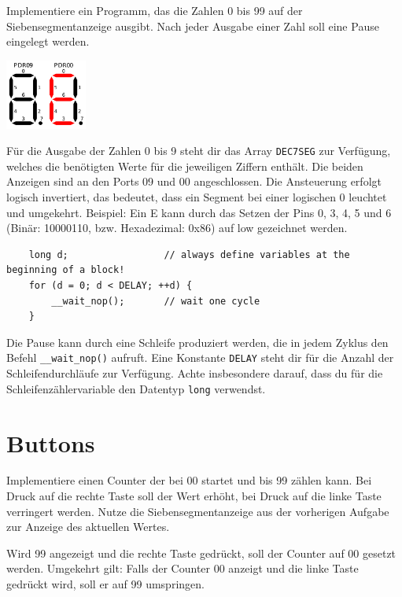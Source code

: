 Implementiere ein Programm, das die Zahlen 0 bis 99 auf der Siebensegmentanzeige ausgibt.
Nach jeder Ausgabe einer Zahl soll eine Pause eingelegt werden.

\begin{center}
	\includegraphics[width=0.2\textwidth]{figures/7seg_e}
\end{center}

Für die Ausgabe der Zahlen 0 bis 9 steht dir das Array \texttt{DEC7SEG} zur Verfügung, welches die benötigten Werte für die jeweiligen Ziffern enthält.
Die beiden Anzeigen sind an den Ports 09 und 00 angeschlossen.
Die Ansteuerung erfolgt logisch invertiert, das bedeutet, dass ein Segment bei einer logischen 0 leuchtet und umgekehrt.
Beispiel: Ein \glqq{}E\grqq{} kann durch das Setzen der Pins 0, 3, 4, 5 und 6 (Binär: 10000110, bzw. Hexadezimal: 0x86) auf low gezeichnet werden.

\begin{lstlisting}
	long d;					// always define variables at the beginning of a block!
	for (d = 0; d < DELAY; ++d) {
		__wait_nop();		// wait one cycle
	}
\end{lstlisting}

Die Pause kann durch eine Schleife produziert werden, die in jedem Zyklus den Befehl \texttt{\_\_wait\_nop()} aufruft.
Eine Konstante \texttt{DELAY} steht dir für die Anzahl der Schleifendurchläufe zur Verfügung.
Achte insbesondere darauf, dass du für die Schleifenzählervariable den Datentyp \texttt{long} verwendst.



\section{Buttons}
Implementiere einen Counter der bei 00 startet und bis 99 zählen kann.
Bei Druck auf die rechte Taste soll der Wert erhöht, bei Druck auf die linke Taste verringert werden.
Nutze die Siebensegmentanzeige aus der vorherigen Aufgabe zur Anzeige des aktuellen Wertes.

Wird 99 angezeigt und die rechte Taste gedrückt, soll der Counter auf 00 gesetzt werden.
Umgekehrt gilt: Falls der Counter 00 anzeigt und die linke Taste gedrückt wird, soll er auf 99 umspringen.

